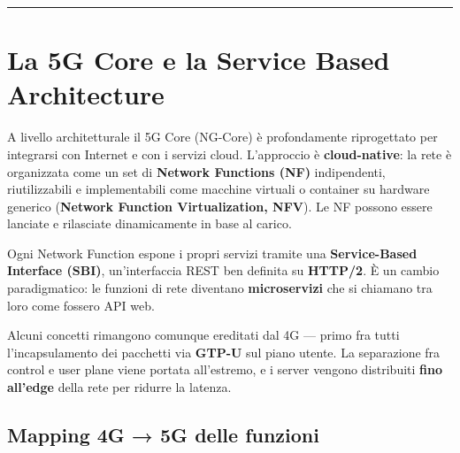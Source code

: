 \documentclass[
  italian,
  openany]{book}
\begin{document}
\begin{center}\rule{0.5\linewidth}{0.5pt}\end{center}

\section{La 5G Core e la Service Based
Architecture}\label{la-5g-core-e-la-service-based-architecture}

A livello architetturale il 5G Core (NG-Core) è profondamente
riprogettato per integrarsi con Internet e con i servizi cloud.
L'approccio è \textbf{cloud-native}: la rete è organizzata come un set
di \textbf{Network Functions (NF)} indipendenti, riutilizzabili e
implementabili come macchine virtuali o container su hardware generico
(\textbf{Network Function Virtualization, NFV}). Le NF possono essere
lanciate e rilasciate dinamicamente in base al carico.

Ogni Network Function espone i propri servizi tramite una
\textbf{Service-Based Interface (SBI)}, un'interfaccia REST ben definita
su \textbf{HTTP/2}. È un cambio paradigmatico: le funzioni di rete
diventano \textbf{microservizi} che si chiamano tra loro come fossero
API web.

Alcuni concetti rimangono comunque ereditati dal 4G --- primo fra tutti
l'incapsulamento dei pacchetti via \textbf{GTP-U} sul piano utente. La
separazione fra control e user plane viene portata all'estremo, e i
server vengono distribuiti \textbf{fino all'edge} della rete per ridurre
la latenza.

\subsection{Mapping 4G → 5G delle
funzioni}\label{mapping-4g-5g-delle-funzioni}
\end{document}
